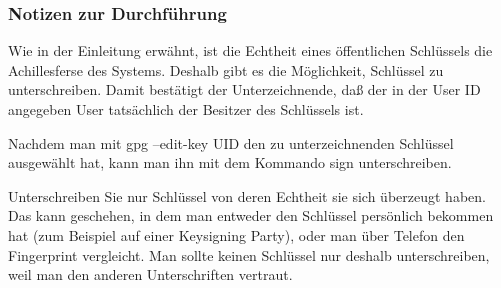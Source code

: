 \documentclass[12pt,a4paper]{article}
\begin{document}
\subsubsection{Notizen zur Durchführung}
Wie in der Einleitung erwähnt, ist die Echtheit eines öffentlichen Schlüssels die Achillesferse des Systems. Deshalb gibt es die Möglichkeit, Schlüssel zu unterschreiben. Damit bestätigt der Unterzeichnende, daß der in der User ID angegeben User tatsächlich der Besitzer des Schlüssels ist.

Nachdem man mit gpg --edit-key UID den zu unterzeichnenden Schlüssel ausgewählt hat, kann man ihn mit dem Kommando sign unterschreiben.

Unterschreiben Sie nur Schlüssel von deren Echtheit sie sich überzeugt haben. Das kann geschehen, in dem man entweder den Schlüssel persönlich bekommen hat (zum Beispiel auf einer Keysigning Party), oder man über Telefon den Fingerprint vergleicht. Man sollte keinen Schlüssel nur deshalb unterschreiben, weil man den anderen Unterschriften vertraut.
\end{document}
